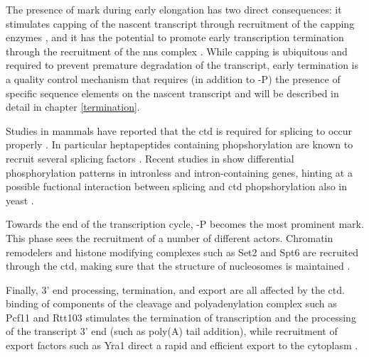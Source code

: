 The presence of \serf{} mark during early elongation has two direct consequences: it stimulates capping of the nascent transcript through recruitment of the capping enzymes \cite{mccracken:1997:5capping}, and it has the potential to promote early transcription termination through the recruitment of the \gls{nns} complex  \cite{vasiljeva:2008:nrd1nab3sen1}.
While capping is ubiquitous and required to prevent premature degradation of the transcript, early termination is a quality control mechanism that requires (in addition to \serf{}-P) the presence of specific sequence elements on the nascent transcript and will be described in detail in chapter \ref{termination}.

Studies in mammals have reported that the \gls{ctd} is required for splicing to occur properly  \cite{mccracken:1997:cterminal}. 
In particular heptapeptides containing \sert{} phopshorylation are known to recruit several splicing factors \cite{gu:2013:ctd}. 
Recent studies in \cer{} show differential phosphorylation patterns in intronless and intron-containing genes, hinting at a possible fuctional interaction between splicing and \gls{ctd} phopshorylation also in yeast \cite{milligan:2016:strandspecific}.

Towards the end of the transcription cycle, \sert{}-P becomes the most prominent mark. 
This phase sees the recruitment of a number of different actors.
Chromatin remodelers and histone modifying complexes such as Set2 and Spt6 are recruited through the \gls{ctd}, making sure that the structure of nucleosomes is maintained \cite{burugula:2014:histone}.

Finally, 3' end processing, termination, and export are all affected by the \gls{ctd}. binding of components of the cleavage and polyadenylation complex such as Pcf11 and Rtt103 stimulates the termination of transcription and the processing of the transcript 3' end (such as poly(A) tail addition), while recruitment of export factors such as Yra1 direct a rapid and efficient export to the cytoplasm \cite{mackellar:2011:cotranscriptional}.
 


\clearpage